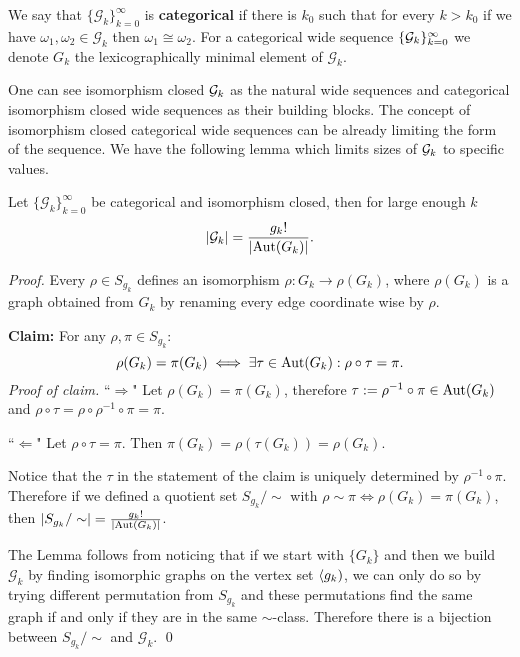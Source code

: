 \begin{defi}\label{lemmisocat}
We say that $\{\mathcal{G}_k\}_{k=0}^\infty$ is \textbf{categorical} if there is $k_0$ such that for every $k>k_0$ if we have $\omega_1,\omega_2\in\mathcal{G}_k$ then $\omega_1\cong \omega_2$. For a categorical wide sequence $\{\mathcal{G}_k\}_{k=0}^\infty$ we denote $G_k$ the lexicographically minimal element of $\mathcal{G}_k$.
\end{defi}

One can see isomorphism closed $\mathcal{G}_k$ as the natural wide sequences and categorical isomorphism closed wide sequences as their building blocks. The concept of isomorphism closed categorical wide sequences can be already limiting the form of the sequence. We have the following lemma which limits sizes of $\mathcal{G}_k$ to specific values.

\begin{lemm}
Let $\{\mathcal{G}_k\}_{k=0}^\infty$ be categorical and isomorphism closed, then for large enough $k$
\[\left|{\mathcal{G}_k}\right|=\frac{g_k!}{\left|{\text{Aut}(G_k)}\right|}.\]
\end{lemm}
\begin{proof}
Every $\rho\in S_{g_k}$ defines an isomorphism $\rho:G_k\to\rho(G_k)$, where $\rho(G_k)$ is a graph obtained from $G_k$ by renaming every edge coordinate wise by $\rho$.

{}
\textbf{Claim:} For any $\rho,\pi\in S_{g_k}$:
\[\rho(G_k)=\pi(G_k)\iff\exists \tau\in\text{Aut}(G_k):\rho\circ\tau=\pi.\]
\textit{Proof of claim.} ``$\Rightarrow$" Let $\rho(G_k)=\pi(G_k)$, therefore $\tau:=\rho^{-1}\circ\pi\in\text{Aut}(G_k)$ and $\rho\circ\tau=\rho\circ\rho^{-1}\circ\pi=\pi.$

``$\Leftarrow$" Let $\rho\circ\tau=\pi$. Then $\pi(G_k)=\rho(\tau(G_k))=\rho(G_k).$ \qedhere

Notice that the $\tau$ in the statement of the claim is uniquely determined by $\rho^{-1}\circ\pi$. Therefore if we defined a quotient set $S_{g_k}/\sim$ with $\rho\sim\pi\iff\rho(G_k)=\pi(G_k)$, then $\left|{S_{g_k}/\sim}\right|=\frac{g_k!}{\left|{\text{Aut}(G_k)}\right|}$.

The Lemma follows from noticing that if we start with $\{G_k\}$ and then we build $\mathcal{G}_k$ by finding isomorphic graphs on the vertex set $\langle g_k)$, we can only do so by trying different permutation from $S_{g_k}$ and these permutations find the same graph if and only if they are in the same $\sim$-class. Therefore there is a bijection between $S_{g_k}/\sim$ and $\mathcal{G}_k$. \qed
\end{proof}

